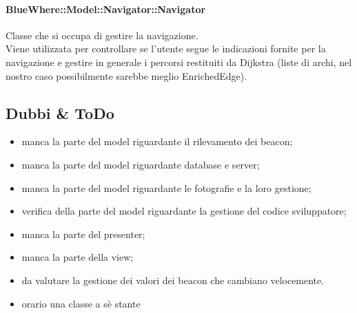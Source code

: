 \documentclass[../SpecificaTecnica.tex]{subfiles}
\begin{document}
				\paragraph{BlueWhere::Model::Navigator::Navigator}
					Classe che si occupa di gestire la navigazione. \\
					Viene utilizzata per controllare se l'utente segue le indicazioni fornite per la navigazione e gestire in generale i percorsi restituiti da Dijkstra (liste di archi, nel nostro caso possibilmente sarebbe meglio EnrichedEdge).

	\subsection{Dubbi \& ToDo}
		\begin{itemize}
			\item manca la parte del model riguardante il rilevamento dei beacon;
			\item manca la parte del model riguardante database e server;
			\item manca la parte del model riguardante le fotografie e la loro gestione;
			\item verifica della parte del model riguardante la gestione del codice sviluppatore;
			\item manca la parte del presenter;
			\item manca la parte della view;
			\item da valutare la gestione dei valori dei beacon che cambiano velocemente.
			\item orario una classe a sè stante
		\end{itemize}
\end{document}

